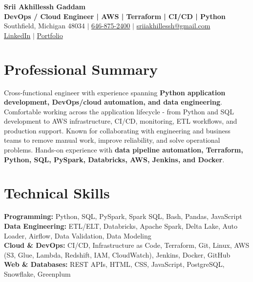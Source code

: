 \documentclass[letterpaper,10pt]{article}
\begin{document}
\fontsize{9.35pt}{10.45pt}\selectfont

\begin{center}
    {\LARGE \textbf{Srii Akhillessh Gaddam}} \\[-1pt]
    \textbf{DevOps / Cloud Engineer | AWS | Terraform | CI/CD | Python} \\[2pt]
    Southfield, Michigan 48034 $|$
    \href{tel:6468752400}{646-875-2400} $|$
    \href{mailto:sriiakhillessh@gmail.com}{sriiakhillessh@gmail.com} \\[1pt]
    \href{https://www.linkedin.com/in/srii-akhiilessh-gaddam-b48668191/}{LinkedIn} $|$
    \href{https://sriiakhillesshg.github.io/portfolio/}{Portfolio}
\end{center}
\vspace{-8pt}

\section{Professional Summary}
\small{Cross-functional engineer with experience spanning \textbf{Python application development, DevOps/cloud automation, and data engineering}. Comfortable working across the application lifecycle - from Python and SQL development to AWS infrastructure, CI/CD, monitoring, ETL workflows, and production support. Known for collaborating with engineering and business teams to remove manual work, improve reliability, and solve operational problems. Hands-on experience with \textbf{data pipeline automation, Terraform, Python, SQL, PySpark, Databricks, AWS, Jenkins, and Docker}.}

\section{Technical Skills}
\small{
\textbf{Programming:} Python, SQL, PySpark, Spark SQL, Bash, Pandas, JavaScript \\
\textbf{Data Engineering:} ETL/ELT, Databricks, Apache Spark, Delta Lake, Auto Loader, Airflow, Data Validation, Data Modeling \\
\textbf{Cloud \& DevOps:} CI/CD, Infrastructure as Code, Terraform, Git, Linux, AWS (S3, Glue, Lambda, Redshift, IAM, CloudWatch), Jenkins, Docker, GitHub \\
\textbf{Web \& Databases:} REST APIs, HTML, CSS, JavaScript, PostgreSQL, Snowflake, Greenplum
}
\end{document}
